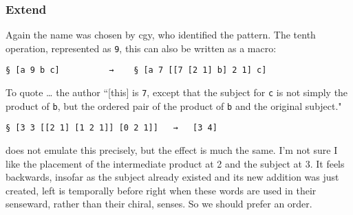 \documentclass[twoside]{article}
\begin{document}




\subsubsection{Extend}

Again the name was chosen by cgy, who identified the pattern. The tenth operation, represented as \texttt{9}, this can also be written as a macro:

\begin{lstlisting}[style=listingcode]
§ [a 9 b c]          →    § [a 7 [[7 [2 1] b] 2 1] c]
\end{lstlisting}

\noindent
To quote \ldots{} the author ``[this] is \texttt{7}, except that the subject for \texttt{c} is not simply the product of \texttt{b}, but the ordered pair of the product of \texttt{b} and the original subject."

\begin{lstlisting}[style=listingblock]
§ [3 3 [[2 1] [1 2 1]] [0 2 1]]   →   [3 4]
\end{lstlisting}

\noindent
does not emulate this precisely, but the effect is much the same. I'm not sure I like the placement of the intermediate product at 2 and the subject at 3. It feels backwards, insofar as the subject already existed and its new addition was just created, left is temporally before right when these words are used in their senseward, rather than their chiral, senses. So we should prefer an order.

\end{document}
